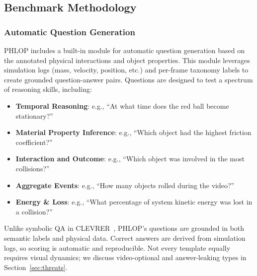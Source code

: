 \documentclass[conference]{IEEEtran}
\begin{document}
\subsection{Benchmark Methodology}


\subsubsection{Automatic Question Generation}
PHLOP includes a built-in module for automatic question generation based on the annotated physical interactions and object properties.  This module leverages simulation logs (mass, velocity, position, etc.) and per-frame taxonomy labels to create grounded question-answer pairs. Questions are designed to test a spectrum of reasoning skills, including:
\begin{itemize}
    \item \textbf{Temporal Reasoning}: e.g., ``At what time does the red ball become stationary?''
    \item \textbf{Material Property Inference}: e.g., ``Which object had the highest friction coefficient?''
    \item \textbf{Interaction and Outcome}:
          e.g., ``Which object was involved in the most collisions?''
    \item \textbf{Aggregate Events}: e.g., ``How many objects rolled during the video?''
    \item \textbf{Energy \& Loss}: e.g., ``What percentage of system kinetic energy was lost in a collision?''
\end{itemize}

Unlike symbolic QA in CLEVRER~\cite{yi2020clevrer}, PHLOP's questions are grounded in both semantic labels and physical data. Correct answers are derived from simulation logs, so scoring is automatic and reproducible. Not every template equally requires visual dynamics; we discuss video-optional and answer-leaking types in Section~\ref{sec:threats}.
\end{document}
